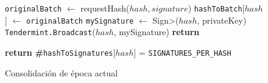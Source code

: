  \begin{figure}[t!]
  \begin{adjustbox}{minipage=[t]{\columnwidth}}
    \begin{algorithm}[H]
      \renewcommand{\thealgorithm}{ABCI Haschain - Parte 2}         
      \caption{\small Consolidación de época actual}%
      \label{alg:abci-hash2}%
      \small
      \begin{algorithmic}[1]
            	\label{alg:hash_revert}
                \State \texttt{originalBatch} $\leftarrow$ requestHash($hash, signature$)
					\State \texttt{hashToBatch}[$hash$]  $\leftarrow$ \texttt{originalBatch}     
                			\State \texttt{mySignature} $\leftarrow$ \<Sign>($hash$, privateKey)
                			\State \texttt{Tendermint.Broadcast}($hash$, mySignature)
					\EndIf   
				\EndIf             	
                	\State \textbf{return}
            \EndFunction
            
             \label{alg:hash_consolidated}
            		\State \textbf{return} \textbf{\#}\texttt{hashToSignatures}[$hash$] = \texttt{SIGNATURES\_PER\_HASH}
            \EndFunction

        \end{algorithmic}
      \end{algorithm}
	\end{adjustbox}
  \end{figure}
  